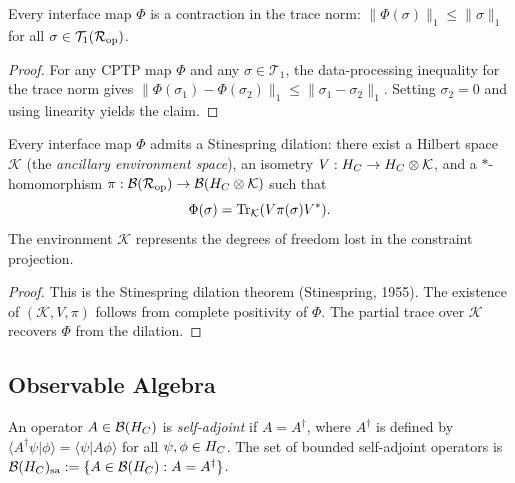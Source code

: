 \begin{lemma}
\label{lem:3.6}
Every interface map $\Phi$ is a contraction in the trace norm:
$\|\Phi(\sigma)\|_1 \leq \|\sigma\|_1$ for all
$\sigma \in \mathcal{T}_1(\mathcal{R}_{\mathrm{op}})$.
\end{lemma}

\begin{proof}
For any CPTP map $\Phi$ and any $\sigma \in \mathcal{T}_1$, the
data-processing inequality for the trace norm gives
$\|\Phi(\sigma_1) - \Phi(\sigma_2)\|_1 \leq \|\sigma_1 - \sigma_2\|_1$.
Setting $\sigma_2 = 0$ and using linearity yields the claim.
\end{proof}

\begin{proposition}
\label{prop:3.5}
Every interface map $\Phi$ admits a Stinespring dilation: there exist a
Hilbert space $\mathcal{K}$ (the \emph{ancillary environment space}), an
isometry $V : H_C \to H_C \otimes \mathcal{K}$, and a $*$-homomorphism
$\pi : \mathcal{B}(\mathcal{R}_{\mathrm{op}}) \to \mathcal{B}(H_C \otimes \mathcal{K})$ such that
\[
  \Phi(\sigma) = \mathrm{Tr}_{\mathcal{K}}(V \pi(\sigma) V^*).
\]
The environment $\mathcal{K}$ represents the degrees of freedom lost in
the constraint projection.
\end{proposition}

\begin{proof}
This is the Stinespring dilation theorem (Stinespring, 1955).  The
existence of $(\mathcal{K}, V, \pi)$ follows from complete positivity
of $\Phi$.  The partial trace over $\mathcal{K}$ recovers $\Phi$ from
the dilation.
\end{proof}

\subsection{Observable Algebra}
\label{sec:ch3:observable}

\begin{definition}
\label{def:3.19}
An operator $A \in \mathcal{B}(H_C)$ is \emph{self-adjoint} if $A = A^\dagger$,
where $A^\dagger$ is defined by
$\langle A^\dagger \psi | \phi \rangle = \langle \psi | A\phi \rangle$
for all $\psi, \phi \in H_C$.  The set of bounded self-adjoint operators
is $\mathcal{B}(H_C)_{\mathrm{sa}} := \{ A \in \mathcal{B}(H_C) : A = A^\dagger \}$.
\end{definition}

